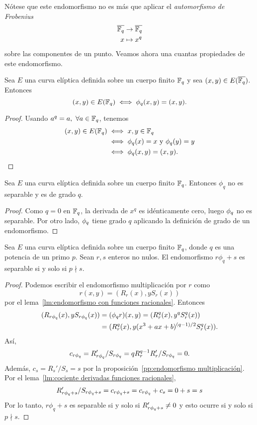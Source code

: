 Nótese que este endomorfismo no es más que aplicar el \emph{automorfismo de Frobenius}
\begin{align*}
	\overline{\mathbb{F}_q} &\to \overline{\mathbb{F}_q} \\
	x &\mapsto x^q
\end{align*}
sobre las componentes de un punto. Veamos ahora una cuantas propiedades de este endomorfismo.

\begin{lema}\label{lm:elementos fijos endomorfismo Frobenius}
	Sea $E$ una curva elíptica definida sobre un cuerpo finito $\mathbb{F}_q$ y sea $(x, y) \in E(\overline{\mathbb{F}_q})$. Entonces
	$$
		(x, y) \in E(\mathbb{F}_q) \iff \phi_q(x, y) = (x, y).
	$$
\end{lema}
\begin{proof}
Usando $a^q = a, \ \forall a \in \mathbb{F}_q$, tenemos
	\begin{align*}
		(x, y) \in E(\mathbb{F}_q) &\iff x, y \in \mathbb{F}_q \\
			&\iff \phi_q(x) = x \textrm{ y } \phi_q(y) = y \\
			&\iff \phi_q(x, y) = (x, y).
	\end{align*}
\end{proof}

\begin{lema}
	Sea $E$ una curva elíptica definida sobre un cuerpo finito $\mathbb{F}_q$. Entonces $\phi_q$ no es separable y es de grado $q$.
\end{lema}
\begin{proof}

Como $q = 0$ en $\mathbb{F}_q$, la derivada de $x^q$ es idénticamente cero, luego $\phi_q$ no es separable. Por otro lado, $\phi_q$ tiene grado $q$ aplicando la definición de grado de un endomorfismo.
\end{proof}

\begin{proposicion}\label{pp:separabilidad endomorfismo frobenius menos uno}
	Sea $E$ una curva elíptica definida sobre un cuerpo finito $\mathbb{F}_q$, donde $q$ es una potencia de un primo $p$. Sean $r, s$ enteros no nulos. El endomorfismo $r \phi_q + s$ es separable si y solo si $p \nmid s$.
\end{proposicion}
\begin{proof}
Podemos escribir el endomorfismo multiplicación por $r$ como
$$
	r(x, y) = (R_r(x), y S_r(x))
$$
por el lema~\ref{lm:endomorfismo con funciones racionales}. Entonces
\begin{align*}
	(R_{r \phi_q}(x), y S_{r \phi_q}(x)) &= (\phi_q r) ( x, y) = (R_r^q(x), y^q S_r^q(x)) \\
	&= (R_r^q(x), y(x^3 + a x + b)^{(q-1)/2} S_r^q(x)).
\end{align*}
Así,
$$
	c_{r \phi_q} = R_{r \phi_q}' / S_{r \phi_q} = q R_r^{q - 1} R_r' / S_{r \phi_q} = 0.
$$
Además, $c_s = R_s' / S_s = s$ por la proposición~\ref{pp:endomorfismo multiplicación}. Por el lema~\ref{lm:cociente derivadas funciones racionales},
$$
	R_{r \phi_q + s}' / S_{r \phi_q + s} = c_{r \phi_q + s} = c_{r \phi_q} + c_{s} = 0 + s = s
$$
Por lo tanto, $r \phi_q + s$ es separable si y solo si $R_{r \phi_q + s}' \neq 0$ y esto ocurre si y solo si $p \nmid s$.
\end{proof}

